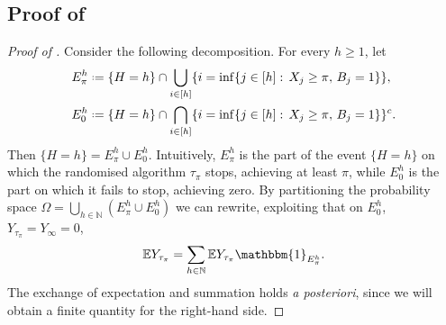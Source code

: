 \documentclass[11pt, a4paper, twoside]{article}
\newcommand*{\defeq}{\mathrel{\vcenter{\baselineskip0.5ex \lineskiplimit0pt
			\hbox{\scriptsize.}\hbox{\scriptsize.}}}=}
\newcommand{\NN}{\mathbb{N}}
\newcommand{\EE}{\mathbb{E}}
\newcommand{\II}{\mathbbm{1}}
\numberwithin{equation}{section}
\begin{document}
	\subsection{Proof of }\label{suppGclassalgran}
	\begin{proof}[Proof of ]
		Consider the following decomposition. For every $h\ge 1$, let
		\begin{align*}
			E_\pi^h&\defeq \{H=h\}\cap\bigcup_{i\in[h]}\{i=\inf\{j\in[h]:\,X_j\ge \pi,\,B_j=1\}\},\\
			E_0^h&\defeq \{H=h\}\cap\bigcap_{i\in[h]}\{i=\inf\{j\in[h]:\,X_j\ge \pi,\,B_j=1\}\}^c.
		\end{align*}
		Then $\{H=h\}= E_\pi^h\cup E_0^h$. Intuitively, $E_\pi^h$ is the part of the event $\{H=h\}$ on which the randomised algorithm $\tau_\pi$ stops, achieving at least $\pi$, while $E_0^h$ is the part on which it fails to stop, achieving zero. By partitioning the probability space $\Omega=\bigcup_{h\in\NN}(E_\pi^h\cup E_0^h)$ we can rewrite, exploiting that on $E_0^h$, $Y_{\tau_\pi}=Y_\infty =0$,  
		\[\EE Y_{\tau_\pi}=\sum_{h\in\NN}\EE Y_{\tau_\pi}\II_{E_\pi^h}.\] 
		The exchange of expectation and summation holds \textit{a posteriori}, since we will obtain a finite quantity for the right-hand side. 
		

\end{proof}
\end{document}
